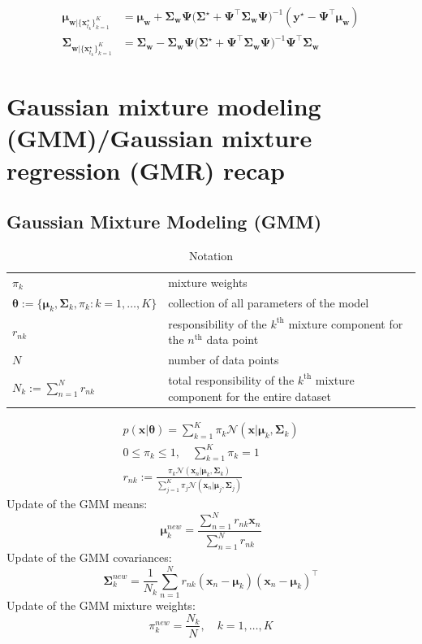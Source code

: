 \documentclass{article}
\begin{document}
\begin{align}
\bm{\mu}_{\bm{w}|\{\bm{x}_{t_k}^\star\}_{k=1}^K} &= \bm{\mu_w} + \bm{\Sigma_w}\bm{\Psi} \Big(\bm{\Sigma}^\star + \bm{\Psi}^\top \bm{\Sigma_w}\bm{\Psi} \Big)^{-1} (\bm{y}^\star - \bm{\Psi}^\top \bm{\mu_w})\\
\bm{\Sigma}_{\bm{w}|\{\bm{x}_{t_k}^\star\}_{k=1}^K} &= \bm{\Sigma_w} - \bm{\Sigma_w}\bm{\Psi} \Big(\bm{\Sigma}^\star + \bm{\Psi}^\top \bm{\Sigma_w}\bm{\Psi} \Big)^{-1} \bm{\Psi}^\top \bm{\Sigma_w}
\end{align}


\section{Gaussian mixture modeling (GMM)/Gaussian mixture regression (GMR) recap}
\subsection{Gaussian Mixture Modeling (GMM)}
\begin{table}
  \centering
  \caption{Notation}
  \begin{tabular}{ll}
    \toprule
    $\pi_{k}$ & mixture weights\\
     $\bm{\theta} := \{\bm{\mu}_{k}, \bm{\Sigma}_{k}, \pi_{k}: k=1, \dots, K\}$ & collection of all parameters of the model\\
     $r_{nk}$ & responsibility of the $k^{\text{th}}$ mixture component for the $n^{\text{th}}$ data point\\
     $N$ & number of data points\\
     $N_{k} := \sum^{N}_{n=1} r_{nk}$ & total responsibility of the $k^{\text{th}}$ mixture component for the entire dataset\\
       \bottomrule
  \end{tabular}
\end{table}

\begin{gather}
  p(\bm{x}|\bm{\theta}) = \sum^{K}_{k=1} \pi_{k}  \mathcal{N}(\bm{x}|\bm{\mu}_{k}, \bm{\Sigma}_{k})\\
  0 \leq \pi_{k} \leq 1, \quad \sum^{K}_{k=1} \pi_{k} = 1\\
  r_{nk} := \frac{\pi_{k}  \mathcal{N}(\bm{x}_{n}|\bm{\mu}_{k}, \bm{\Sigma}_{k})}{\sum^{K}_{j=1} \pi_{j}  \mathcal{N}(\bm{x}_{n}|\bm{\mu}_{j}, \bm{\Sigma}_{j})}
\end{gather}
Update of the GMM means:
\begin{equation}
  \bm{\mu}_{k}^{new} = \frac{\sum_{n=1}^{N}r_{nk}\bm{x}_{n}}{\sum_{n=1}^{N}r_{nk}}
\end{equation}
Update of the GMM covariances:
\begin{equation}
  \bm{\Sigma}_{k}^{new} = \frac{1}{N_{k}} \sum^{N}_{n=1} r_{nk} (\bm{x}_{n} - \bm{\mu}_{k})(\bm{x}_{n} - \bm{\mu}_{k})^{\top}
\end{equation}
Update of the GMM mixture weights:
\begin{equation}
  \pi_{k}^{new} = \frac{N_{k}}{N}, \quad k=1, \dots, K
\end{equation}
\end{document}
